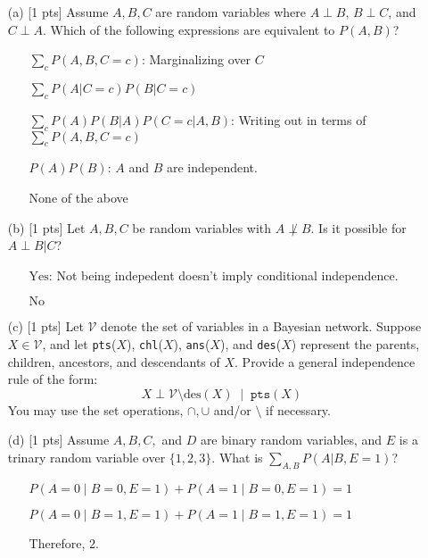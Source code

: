 \begin{example}
    \begin{enumerate}
        \item[(a)] [1 pts] Assume \( A, B, C \) are random variables where \( A \perp B \), \( B \perp C \), and \( C \perp A \). Which of the following expressions are equivalent to \( P(A, B) \)?
        
        \begin{itemize}
            \item[ ] \( \boxed{\sum_c P(A, B, C = c)} \): Marginalizing over $C$
            \item[ ] \( \sum_c P(A|C = c) P(B|C = c) \)
            \item[ ] \(\boxed{\sum_c P(A) P(B|A) P(C = c | A, B)} \): Writing out in terms of $\sum_c P(A, B, C = c)$
            \item[ ] \( \boxed{P(A) P(B)} \): $A$ and $B$ are independent.
            \item[ ] None of the above
        \end{itemize}

        \item[(b)] [1 pts] Let \( A, B, C \) be random variables with \( A \not\perp B \). Is it possible for \( A \perp B | C \)? 
        
        \begin{itemize}
            \item[ ] $\boxed{\text{Yes}}$: Not being indepedent doesn't imply conditional independence.
            \item[ ] $\text{No}$
        \end{itemize}

        \item[(c)] [1 pts] Let \( \mathcal{V} \) denote the set of variables in a Bayesian network. Suppose \( X \in \mathcal{V} \), and let \texttt{pts}(\( X \)), \texttt{chl}(\( X \)), \texttt{ans}(\( X \)), and \texttt{des}(\( X \)) represent the parents, children, ancestors, and descendants of \( X \). Provide a general independence rule of the form: 
        \[
        X \perp \mathcal{V} \setminus \text{des}(X) \; \mid \; \texttt{pts}(X)
        \]
        You may use the set operations, \( \cap, \cup \) and/or \( \setminus \) if necessary.

        \item[(d)] [1 pts] Assume \( A, B, C, \) and \( D \) are binary random variables, and \( E \) is a trinary random variable over \( \{1,2,3\} \). What is \( \sum_{A,B} P(A|B, E = 1) \)?

        \begin{itemize}
            \item[ ] $P(A=0 \mid B=0, E=1) + P(A=1 \mid B=0, E=1) = 1$ 
            \item[ ] $P(A=0 \mid B=1, E=1) + P(A=1 \mid B=1, E=1) = 1$
            \item[] Therefore, $2$.
        \end{itemize}
    \end{enumerate}
\end{example}
